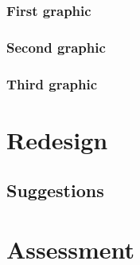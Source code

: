 \documentclass{article}
\begin{document}
\subsubsection{First graphic}
\subsubsection{Second graphic}
\subsubsection{Third graphic}


\section{Redesign}
\subsection{Suggestions}

\section{Assessment}
\end{document}
